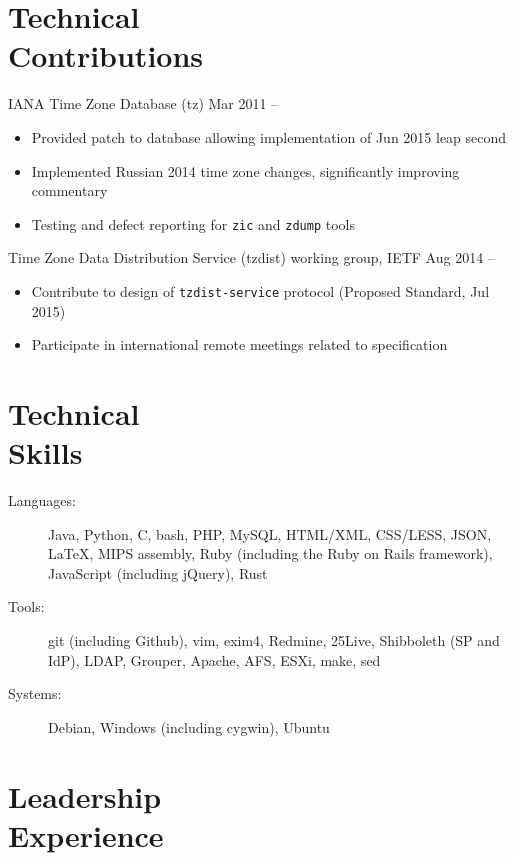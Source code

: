 \documentclass[11pt]{article}
\newcommand{\textdb}[1]{\fontseries{db}\selectfont#1\normalfont}
\newcommand{\present}{\phantom{Xxx 20XX}}
\newcommand{\itemizeonly}{\leavevmode\par\vspace{\dimexpr-\baselineskip-\parskip}}
\begin{document}
\section{Technical\\ Contributions}

\textdb{
IANA Time Zone Database (tz)
	\hfill Mar 2011 -- \present
}
\begin{itemize}
	\item Provided patch to database allowing implementation of Jun 2015 leap second
	\item Implemented Russian 2014 time zone changes,
		significantly improving commentary
	\item Testing and defect reporting for \texttt{zic} and \texttt{zdump} tools
\end{itemize}

\textdb{
Time Zone Data Distribution Service (tzdist) working group, IETF
	\hfill Aug 2014 -- \present
}
\begin{itemize}
	\item Contribute to design of \texttt{tzdist-service} protocol (Proposed Standard, Jul 2015)
	\item Participate in international remote meetings related to specification
\end{itemize}



\section{Technical\\ Skills}

\itemizeonly
\begin{description}
	\item[\textdb{Languages:}] Java, Python, C, bash, PHP, MySQL, HTML/XML, CSS/LESS, JSON,
		\LaTeX, MIPS assembly, Ruby (including the Ruby on Rails framework), JavaScript (including jQuery), Rust
	\item[\textdb{Tools:}] git (including Github), vim, exim4, Redmine, 25Live, Shibboleth (SP and IdP),
		LDAP, Grouper, Apache, AFS, ESXi, make, sed
	\item[\textdb{Systems:}] Debian, Windows (including cygwin), Ubuntu
\end{description}



\section{Leadership\\ Experience}
\end{document}
